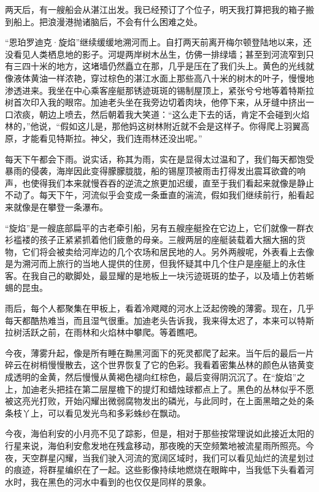 \documentclass[AutoFakeBold=true]{book}
\begin{document}
两天后，有一艘船会从湛江出发。我已经预订了个位子，明天我打算把我的箱子搬到船上。把浪漫港抛诸脑后，不会有什么困难之处。

\vspace*{1em}{\kaishu 第四十一日：}

``恩珀罗迪克·旋焰''继续缓缓地溯河而上。自打两天前离开梅尔顿登陆地以来，还没看见人类栖息地的影子。河堤两岸树木丛生，仿佛一排绿墙；甚至到河流窄到只有三四十米的地方，这堵墙仍然矗立在那，几乎是压在了我们头上。黄色的光线就像液体黄油一样浓艳，穿过棕色的湛江水面上那些高八十米的树木的叶子，慢慢地渗透进来。我坐在中心乘客座艇那锈迹斑斑的锡制屋顶上，紧张兮兮地等着特斯拉树首次印入我的眼帘。加迪老头坐在我旁边切着肉块，他停下来，从牙缝中挤出一口浓痰，朝边上喷去，然后朝着我大笑道：``这么走下去的话，肯定不会碰到火焰林的，''他说，``假如这儿是，那他妈这树林附近就不会是这样子。你得爬上羽翼高原，才能看见特斯拉。神父，我们连雨林还没出呢。''

每天下午都会下雨。说实话，称其为雨，实在是显得太过温和了，我们每天都饱受暴雨的侵袭，海岸因此变得朦朦胧胧，船的锡屋顶被雨击打得发出震耳欲聋的响声，也使得我们本来就慢吞吞的逆流之旅更加迟缓，直至于我们看起来就像是静止不动了。每天下午，河流似乎会变成一条垂直的湍流，假如我们继续前行，船看起来就像是在攀登一条瀑布。

``旋焰''是一艘底部扁平的古老牵引船，另有五艘座艇拴在它边上，它们就像一群衣衫褴褛的孩子正紧紧抓着他们疲惫的母亲。三艘两层的座艇装载着大捆大捆的货物，它们将会被卖给河岸边的几个农场和居民地的人。另外两艘呢，外表看上去像是为溯河而上旅行的当地人提供的住房，但我怀疑其中几个住户是座艇上的永住客。在我自己的歇脚处，最显耀的是地板上一块污迹斑斑的垫子，以及墙上仿若蜥蜴的昆虫。

雨后，每个人都聚集在甲板上，看着冷飕飕的河水上泛起傍晚的薄雾。现在，几乎每天都酷热难当，而且湿气很重。加迪老头告诉我，我来得太迟了，本来可以特斯拉树活跃之前，在雨林和火焰林中攀爬。等着瞧吧。

今夜，薄雾升起，像是所有睡在黝黑河面下的死灵都爬了起来。当午后的最后一片碎云在树梢慢慢散去，这个世界恢复了它的色彩。我看着密集丛林的颜色从铬黄变成透明的金黄，然后慢慢从黄褐色褪向红棕色，最后变得阴沉沉了。在``旋焰''之上，加迪老头把挂在第二层屋檐下的提灯和蜡烛球都点上了。黑色的丛林似乎不愿被这亮光打败，开始闪耀出微弱腐物发出的磷光，与此同时，在上面黑暗之处的条条枝丫上，可以看见发光鸟和多彩蛛纱在飘动。

今夜，海伯利安的小月亮不见了踪影，但是，相对于那些按常理说如此接近太阳的行星来说，海伯利安愈发地在残盒移动，那夜晚的天空频繁地被流星雨所照亮。今夜，天空群星闪耀，当我们驶入河流的宽阔区域时，我们可以看见灿烂的流星划过的痕迹，将群星编织在了一起。这些影像持续地燃烧在眼眸中，当我低下头看着河水时，我在黑色的河水中看到的也仅仅是同样的景象。
\end{document}
